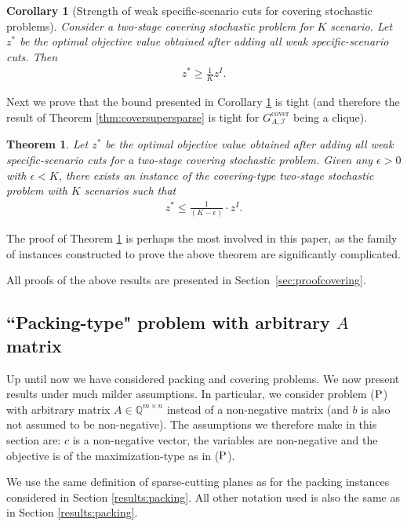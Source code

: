 \documentclass[smallextended]{svjour3}
\newtheorem{theorem}[proposition]{Theorem}
\newtheorem{corollary}[proposition]{Corollary}
\begin{document}
\begin{corollary}[Strength of weak specific-scenario cuts for covering stochastic problems]\label{cor:stoccover}
Consider a two-stage covering stochastic problem for $K$ scenario. Let $z^{*}$
be the optimal objective value obtained after adding all weak specific-scenario cuts. Then 
\begin{eqnarray*}
z^{*} \geq \frac{1}{K} z^{I}.
\end{eqnarray*}
\end{corollary}

Next we prove that the bound presented in Corollary \ref{cor:stoccover} is tight (and therefore the result of Theorem \ref{thm:coversupersparse} is tight for ${G^{\textrm{cover}}_{A, {\mathcal{I}}}}$ being a clique).

\begin{theorem}\label{thm:stoccovertight}
Let $z^{*}$ be the optimal objective value obtained after adding all weak specific-scenario cuts for a two-stage covering stochastic problem. Given any $\epsilon >0$ with $\epsilon <K$, there exists an instance of the covering-type two-stage stochastic problem with $K$ scenarios such that
\begin{eqnarray*}
z^{*} \leq \frac{1}{(K - \epsilon)} \cdot z^{I}.
\end{eqnarray*}
\end{theorem}
The proof of Theorem \ref{thm:stoccovertight} is perhaps the most involved in this paper, as the family of instances constructed to prove the above theorem are significantly complicated. 

All proofs of the above results are presented in Section~\ref{sec:proofcovering}.

\subsection{``Packing-type" problem with arbitrary $A$ matrix}\label{results:genpacking}
Up until now we have considered packing and covering problems. We now present results under much milder assumptions. In particular, we consider problem ($\textup{P}$) with arbitrary matrix $A \in \mathbb{Q}^{m \times n}$ instead of a non-negative matrix (and $b$ is also not assumed to be non-negative). The assumptions we therefore make in this section are: $c$ is a non-negative vector, the variables are non-negative and the objective is of the maximization-type as in ($\textup{P}$).

We use the same definition of sparse-cutting planes as for the packing instances considered in Section \ref{results:packing}. All other notation used is also the same as in Section \ref{results:packing}.
\end{document}
